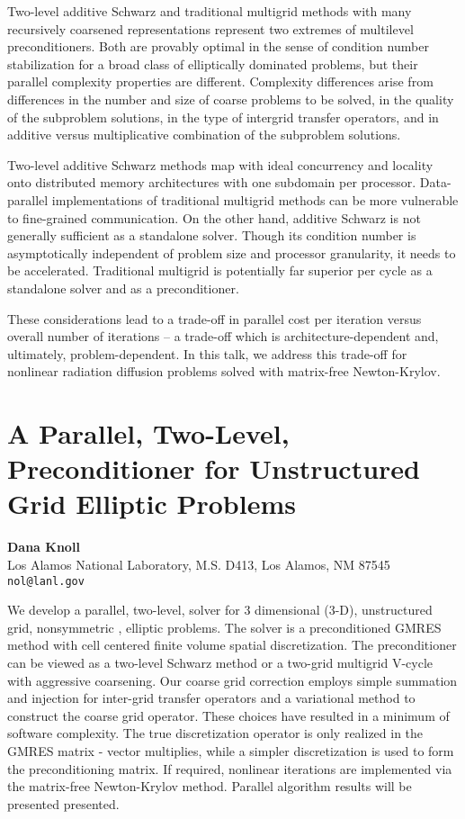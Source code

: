 \documentclass[11pt]{article}
\newcommand{\nextab}[4]{
	\section{#2}
	{\bf #1} \\ \nopagebreak
	{#3} \\ \nopagebreak
	{\tt #4} \nopagebreak
	}
\begin{document}
Two-level additive Schwarz and traditional multigrid methods with many
recursively coarsened representations represent two extremes of multilevel
preconditioners. Both are provably optimal in the sense of condition
number stabilization for a broad class of elliptically dominated problems,
but their parallel complexity properties are different.  Complexity
differences arise from differences in the number and size of coarse
problems to be solved, in the quality of the subproblem solutions, in the
type of intergrid transfer operators, and in additive versus
multiplicative combination of the subproblem solutions.

Two-level additive Schwarz methods map with ideal concurrency and locality
onto distributed memory architectures with one subdomain per processor.
Data-parallel implementations of traditional multigrid methods can be more
vulnerable to fine-grained communication.  On the other hand, additive
Schwarz is not generally sufficient as a standalone solver. Though its
condition number is asymptotically independent of problem size and
processor granularity, it needs to be accelerated. Traditional multigrid
is potentially far superior per cycle as a standalone solver and as a
preconditioner.

These considerations lead to a trade-off in parallel cost per iteration
versus overall number of iterations -- a trade-off which is
architecture-dependent and, ultimately, problem-dependent.  In this talk,
we address this trade-off for nonlinear radiation diffusion problems
solved with matrix-free Newton-Krylov.


\nextab{Dana Knoll}
	{A Parallel, Two-Level, Preconditioner for Unstructured Grid
		Elliptic Problems}
	{Los Alamos National Laboratory,
		M.S. D413, Los Alamos, NM 87545}
	{nol@lanl.gov}

We develop a parallel, two-level, solver for 3 dimensional (3-D),
unstructured grid, nonsymmetric , elliptic problems. The solver
is a preconditioned GMRES method with cell centered finite volume
spatial discretization.  The preconditioner can be viewed
as a two-level Schwarz method or a two-grid multigrid V-cycle with
aggressive coarsening. Our coarse grid correction employs simple
summation and injection for inter-grid transfer operators and
a variational method to construct the coarse grid operator.  These
choices have resulted in a minimum of software complexity.
The true discretization operator is only realized in the
GMRES matrix - vector multiplies, while a simpler discretization
is used to form the preconditioning matrix.  If required, nonlinear
iterations are implemented via the matrix-free Newton-Krylov
method. Parallel algorithm results will be presented presented.
\end{document}
